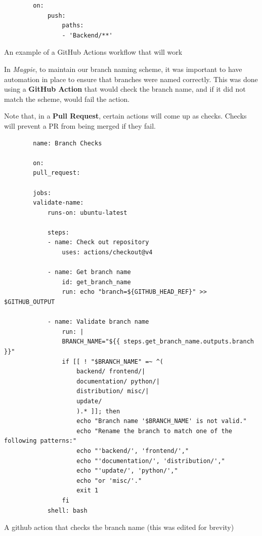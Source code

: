 \begin{listing}[htbp]
    \centering{}
    \begin{verbatim}
        on:
            push:
                paths:
                - 'Backend/**'
    \end{verbatim}
    \caption{An example of a GitHub Actions workflow that will work}
\end{listing}

\newpage{}

In \textit{Magpie}, to maintain our branch naming scheme, it was important to
have automation in place to ensure that branches were named correctly. This was
done using a \textbf{GitHub Action} that would check the branch name, and if it
did not match the scheme, would fail the action.

Note that, in a \textbf{Pull Request}, certain actions will come up as checks. 
Checks will prevent a PR from being merged if they fail.

\begin{listing}[htbp]
    \begin{verbatim}
        name: Branch Checks

        on:
        pull_request:

        jobs:
        validate-name:
            runs-on: ubuntu-latest

            steps:
            - name: Check out repository
                uses: actions/checkout@v4

            - name: Get branch name
                id: get_branch_name
                run: echo "branch=${GITHUB_HEAD_REF}" >> $GITHUB_OUTPUT

            - name: Validate branch name
                run: |
                BRANCH_NAME="${{ steps.get_branch_name.outputs.branch }}"
                if [[ ! "$BRANCH_NAME" =~ ^(
                    backend/ frontend/|
                    documentation/ python/|
                    distribution/ misc/|
                    update/
                    ).* ]]; then
                    echo "Branch name '$BRANCH_NAME' is not valid."
                    echo "Rename the branch to match one of the following patterns:"
                    echo "'backend/', 'frontend/',"
                    echo "'documentation/', 'distribution/',"
                    echo "'update/', 'python/',"
                    echo "or 'misc/'."
                    exit 1
                fi
            shell: bash
    \end{verbatim}
    \caption{A github action that checks the branch name (this was edited for brevity)}
\end{listing}

